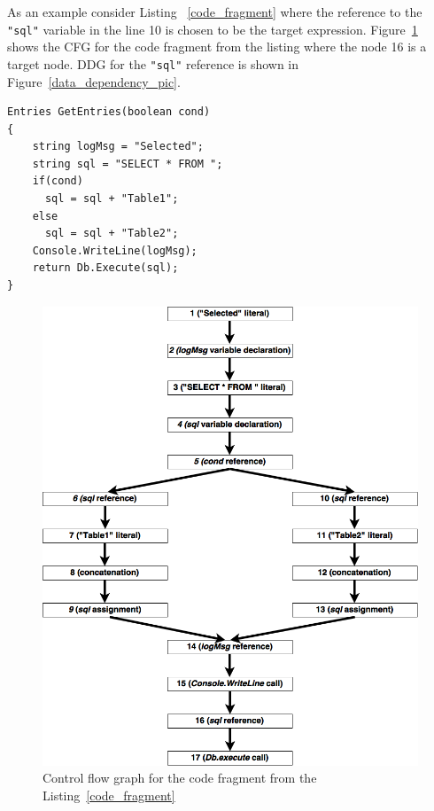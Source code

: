 \documentclass{sig-alternate-05-2015}
\begin{document}
As an example consider Listing ~\ref{code_fragment} where the reference to the \verb|"sql"| variable in the line 10 is chosen to be the target expression. Figure~\ref{flow_graph_pic} shows the CFG for the code fragment from the listing where the node 16 is a target node. DDG for the \verb|"sql"| reference is shown in Figure~\ref{data_dependency_pic}.

\begin{lstlisting}[label=code_fragment,caption=C\# code fragment]
Entries GetEntries(boolean cond) 
{
    string logMsg = "Selected";
    string sql = "SELECT * FROM ";
    if(cond)
      sql = sql + "Table1";
    else
      sql = sql + "Table2";
    Console.WriteLine(logMsg);
    return Db.Execute(sql);
}
\end{lstlisting}


\begin{figure}[h!]
    \begin{center}
        \includegraphics[scale=0.3]{Figures/Flow_graph.png}
    \end{center}
    \caption{Control flow graph for the code fragment from the Listing~\ref{code_fragment}}
    \label{flow_graph_pic}
\end{figure} 
\end{document}
